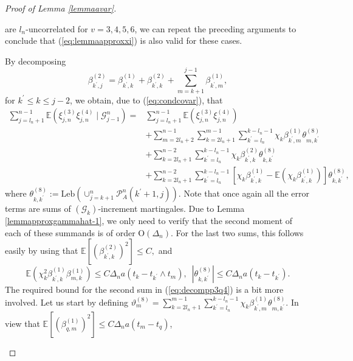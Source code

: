 \documentclass[10pt,a4paper]{amsart}
\newcommand{\Leb}{\ensuremath{\mathrm{Leb}}}
\begin{document}
\begin{proof}[Proof of Lemma \ref{lemmaavar}]
\begin{description}
		are $l_{n}$-uncorrelated for $v=3,4,5,6$, we can repeat the preceding
		arguments to conclude that (\ref{eq:lemmaapproxxi}) is also valid
		for these cases.
		\item [{$p=3$:}] By decomposing 
		\begin{equation}
			\beta_{k^{\prime},j}^{(2)}=\beta_{k^{\prime},k}^{(1)}+\beta_{k^{\prime},k}^{(2)}+\sum_{m=k+1}^{j-1}\beta_{k^{\prime},m}^{(1)},\label{eq:decompp34}
		\end{equation}
		for $k^{\prime}\leq k\leq j-2$, we obtain, due to (\ref{eq:condcovar}),
		that 
		\begin{equation}
			\begin{aligned}\sum_{j=l_{n}+1}^{n-1}\mathbb{E}(\xi_{j,n}^{(3)}\xi_{j,n}^{(4)}\mid\mathscr{G}_{j-1}^{n})= & \sum_{j=l_{n}+1}^{n-1}\mathbb{E}(\xi_{j,n}^{(3)}\xi_{j,n}^{(4)})\\
				& +\sum_{m=2l_{n}+2}^{n-1}\sum_{k=2l_{n}+1}^{m-1}\sum_{k^{\prime}=l_{n}}^{k-l_{n}-1}\chi_{k}\beta_{k^{\prime},m}^{(1)}\theta_{m,k^{\prime}}^{(8)}\\
				& +\sum_{k=2l_{n}+1}^{n-2}\sum_{k^{\prime}=l_{n}}^{k-l_{n}-1}\chi_{k}\beta_{k^{\prime},k}^{(2)}\theta_{k,k^{\prime}}^{(8)}\\
				& +\sum_{k=2l_{n}+1}^{n-2}\sum_{k^{\prime}=l_{n}}^{k-l_{n}-1}[\chi_{k}\beta_{k^{\prime},k}^{(1)}-\mathbb{E}(\chi_{k}\beta_{k^{\prime},k}^{(1)})]\theta_{k,k^{\prime}}^{(8)},
			\end{aligned}
			\label{eq:decompp3q4}
		\end{equation}
		where $\theta_{k,k^{\prime}}^{(8)}:=\Leb(\cup_{j=k+1}^{n}\mathcal{P}_{A}^{n}(k^{\prime}+1,j)).$
		Note that once again all the error terms are sums of $(\mathscr{G}_{k})$-increment
		martingales. Due to Lemma \ref{lemmapproxgammahat-1}, we only need to verify
		that the second moment of each of these summands is of order $\mathrm{O}(\Delta_{n})$.
		For the last two sums, this follows easily by using that $\mathbb{E}[(\beta_{k^{\prime},k}^{(2)})^{2}]\leq C,$
		and
		\[
		\mathbb{E}(\chi_{k}^{2}\beta_{k^{\prime},k}^{(1)}\beta_{m,k}^{(1)})\leq C\Delta_{n}a(t_{k}-t_{k^{\prime}}\land t_{m}),\,\,\,\left|\theta_{k,k^{\prime}}^{(8)}\right|\leq C\Delta_{n}a(t_{k}-t_{k^{\prime}}).
		\]
		The required bound for the second sum in (\ref{eq:decompp3q4}) is
		a bit more involved. Let us start by defining  $\vartheta_{m}^{(8)}=\sum_{k=2l_{n}+1}^{m-1}\sum_{k^{\prime}=l_{n}}^{k-l_{n}-1}\chi_{k}\beta_{k^{\prime},m}^{(1)}\theta_{m,k^{\prime}}^{(8)}$.
		In view that $\mathbb{E}[(\beta_{q,m}^{(1)})^{2}]\leq C\Delta_{n}a(t_{m}-t_{q})$,

\end{description}
\end{proof}
\end{document}
